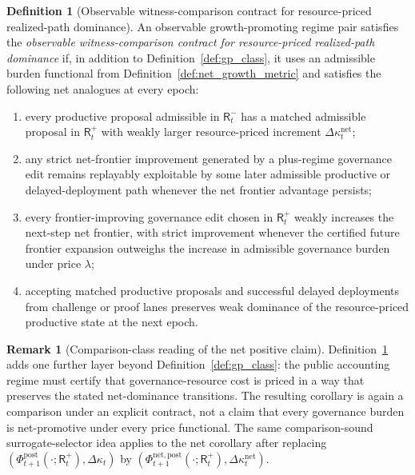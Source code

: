 \documentclass[11pt]{article}
\theoremstyle{definition}
\newtheorem{definition}[theorem]{Definition}
\newtheorem{remark}[theorem]{Remark}
\newcommand{\1}{\mathbf{1}}
\begin{document}
\begin{definition}[Observable witness-comparison contract for resource-priced realized-path dominance]\label{def:gp_net_class}
An observable growth-promoting regime pair satisfies the \emph{observable witness-comparison contract for resource-priced realized-path dominance} if, in addition to Definition~\ref{def:gp_class}, it uses an admissible burden functional from Definition~\ref{def:net_growth_metric} and satisfies the following net analogues at every epoch:
\begin{enumerate}[label=(\roman*), leftmargin=2em]
  \item every productive proposal admissible in $\mathsf R_t^-$ has a matched admissible proposal in $\mathsf R_t^+$ with weakly larger resource-priced increment $\Delta\kappa_t^{\mathrm{net}}$;
  \item any strict net-frontier improvement generated by a plus-regime governance edit remains replayably exploitable by some later admissible productive or delayed-deployment path whenever the net frontier advantage persists;
  \item every frontier-improving governance edit chosen in $\mathsf R_t^+$ weakly increases the next-step net frontier, with strict improvement whenever the certified future frontier expansion outweighs the increase in admissible governance burden under price $\lambda$;
  \item accepting matched productive proposals and successful delayed deployments from challenge or proof lanes preserves weak dominance of the resource-priced productive state at the next epoch.
\end{enumerate}
\end{definition}

\begin{remark}[Comparison-class reading of the net positive claim]
Definition~\ref{def:gp_net_class} adds one further layer beyond Definition~\ref{def:gp_class}: the public accounting regime must certify that governance-resource cost is priced in a way that preserves the stated net-dominance transitions. The resulting corollary is again a comparison under an explicit contract, not a claim that every governance burden is net-promotive under every price functional. The same comparison-sound surrogate-selector idea applies to the net corollary after replacing $(\Phi_{t+1}^{\mathrm{post}}(\cdot;\mathsf R_t^+),\Delta\kappa_t)$ by $(\Phi_{t+1}^{\mathrm{net,post}}(\cdot;\mathsf R_t^+),\Delta\kappa_t^{\mathrm{net}})$.
\end{remark}
\end{document}
